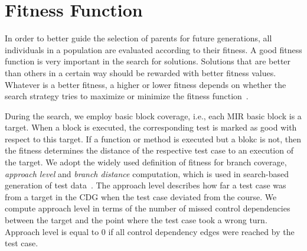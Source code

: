 \documentclass[paper=a4,%
  twoside,%
  BCOR4mm,%
  abstract=true,%
  toc=bibliography,%
  chapterprefix=true,%
  toc=bibliographynumbered,%
  open=right,%
  english,%
  pagesize=pdftex]{scrreprt}
\newcommand{\mir}{\ac{MIR}\xspace}
\newcommand{\cdg}{\ac{CDG}\xspace}
\begin{document}
\section{Fitness Function}
\label{sec:fitness-function}

In order to better guide the selection of parents for future generations, all individuals in a population are evaluated according to their fitness. A good fitness function is very important in the search for solutions. Solutions that are better than others in a certain way should be rewarded with better fitness values. Whatever is a better fitness, a higher or lower fitness depends on whether the search strategy tries to maximize or minimize the fitness function~\cite{McMinn_2004}.

During the search, we employ basic block coverage, i.e., each \mir basic block is a target. When a block is executed, the corresponding test is marked as good with respect to this target. If a function or method is executed but a blokc is not, then the fitness determines the distance of the respective test case to an execution of the target. We adopt the widely used definition of fitness for branch coverage, \emph{approach level} and \emph{branch distance} computation, which is used in search-based generation of test data~\cite{McMinn_2004}. The approach level describes how far a test case was from a target in the \cdg when the test case deviated from the course. We compute approach level in terms of the number of missed control dependencies between the target and the point where the test case took a wrong turn. Approach level is equal to $0$ if all control dependency edges were reached by the test case.
\end{document}
